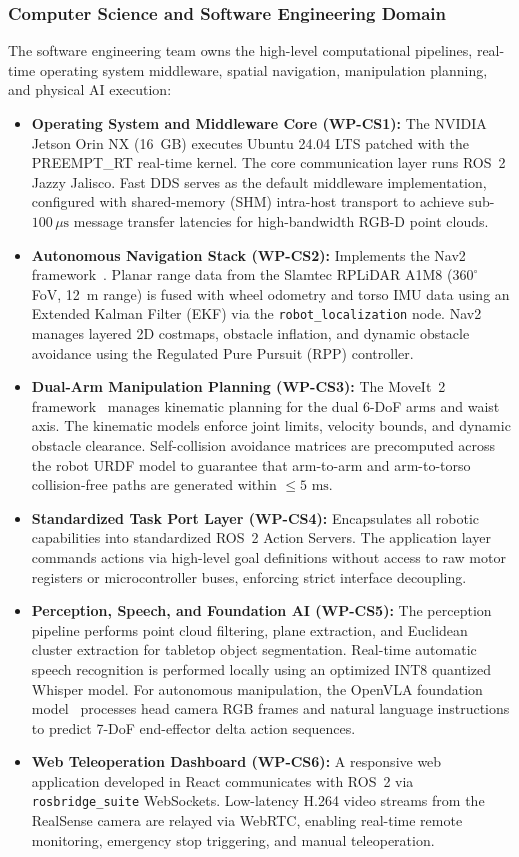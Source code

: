 \subsubsection{Computer Science and Software Engineering Domain}
The software engineering team owns the high-level computational pipelines, real-time operating system middleware, spatial navigation, manipulation planning, and physical AI execution:
\begin{itemize}[leftmargin=1.5em]
  \item \textbf{Operating System and Middleware Core (WP-CS1):} The NVIDIA Jetson Orin NX (16~GB) executes Ubuntu 24.04 LTS patched with the PREEMPT\_RT real-time kernel. The core communication layer runs ROS~2 Jazzy Jalisco. Fast DDS serves as the default middleware implementation, configured with shared-memory (SHM) intra-host transport to achieve sub-$100\,\mu\text{s}$ message transfer latencies for high-bandwidth RGB-D point clouds.
  \item \textbf{Autonomous Navigation Stack (WP-CS2):} Implements the Nav2 framework~\cite{nav2}. Planar range data from the Slamtec RPLiDAR A1M8 ($360^\circ$ FoV, 12~m range) is fused with wheel odometry and torso IMU data using an Extended Kalman Filter (EKF) via the \texttt{robot\_localization} node. Nav2 manages layered 2D costmaps, obstacle inflation, and dynamic obstacle avoidance using the Regulated Pure Pursuit (RPP) controller.
  \item \textbf{Dual-Arm Manipulation Planning (WP-CS3):} The MoveIt~2 framework~\cite{moveit2} manages kinematic planning for the dual 6-DoF arms and waist axis. The kinematic models enforce joint limits, velocity bounds, and dynamic obstacle clearance. Self-collision avoidance matrices are precomputed across the robot URDF model to guarantee that arm-to-arm and arm-to-torso collision-free paths are generated within $\le 5\text{ ms}$.
  \item \textbf{Standardized Task Port Layer (WP-CS4):} Encapsulates all robotic capabilities into standardized ROS~2 Action Servers. The application layer commands actions via high-level goal definitions without access to raw motor registers or microcontroller buses, enforcing strict interface decoupling.
  \item \textbf{Perception, Speech, and Foundation AI (WP-CS5):} The perception pipeline performs point cloud filtering, plane extraction, and Euclidean cluster extraction for tabletop object segmentation. Real-time automatic speech recognition is performed locally using an optimized INT8 quantized Whisper model. For autonomous manipulation, the OpenVLA foundation model~\cite{openvla} processes head camera RGB frames and natural language instructions to predict 7-DoF end-effector delta action sequences.
  \item \textbf{Web Teleoperation Dashboard (WP-CS6):} A responsive web application developed in React communicates with ROS~2 via \texttt{rosbridge\_suite} WebSockets. Low-latency H.264 video streams from the RealSense camera are relayed via WebRTC, enabling real-time remote monitoring, emergency stop triggering, and manual teleoperation.
\end{itemize}

